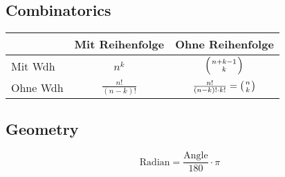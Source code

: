 \documentclass[11pt]{article}
\begin{document}
\subsection{Combinatorics}
\begin{tabular}{ | l | c | c |}
  \hline
   & Mit Reihenfolge & Ohne Reihenfolge \\ \hline
   Mit Wdh & $n^k$ & $\left( {n+k-1} \atop k \right)$  \\ \hline
   Ohne Wdh & $\frac{n!}{\left( n-k \right) !}$ & $\frac{n!}{\left( n-k \right) !\cdot k!} = \left( n \atop k \right)$  \\ \hline
\end{tabular}


\subsection{Geometry}
$$\text{Radian} = \frac{\text{Angle}}{180}\cdot \pi$$
\end{document}
